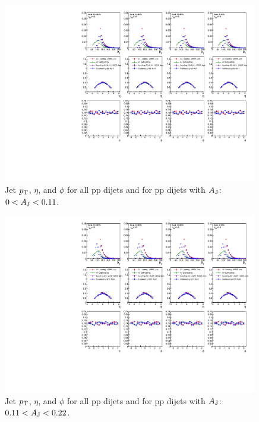 \begin{figure}[htbp]
\begin{center}
\includegraphics[width=0.99\textwidth]{figures/Appendices/JetSummary_pp_Aj0_Aj11.pdf}
\caption{
Jet $p_{\rm T}$, $\eta$, and $\phi$ for all  pp dijets and for  pp dijets with $A_{\rm J}$:  $0<A_{\rm J}<0.11$.  
}
\label{fig:JetKin ppAj0Aj11}
\end{center}
\end{figure}

\begin{figure}[htbp]
\begin{center}
\includegraphics[width=0.99\textwidth]{figures/Appendices/JetSummary_pp_Aj11_Aj22.pdf}
\caption{
Jet $p_{\rm T}$, $\eta$, and $\phi$ for all  pp dijets and for  pp dijets with $A_{\rm J}$:  $0.11<A_{\rm J}<0.22$.  
}
\label{fig:JetKin ppAj11Aj22}
\end{center}
\end{figure}

